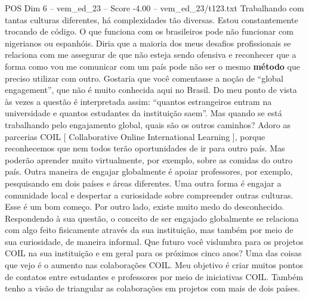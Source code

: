 \begin{textsample}{POS Dim 6 – vem\_ed\_23 – Score -4.00 – vem\_ed\_23/t123.txt}
Trabalhando com tantas culturas diferentes, há complexidades tão diversas.
Estou constantemente trocando de código.
O que funciona com os brasileiros pode não funcionar com nigerianos ou espanhóis.
Diria que a maioria dos meus desafios profissionais se relaciona com me assegurar de que não esteja sendo ofensiva e reconhecer que a forma como vou me comunicar com um país pode não ser o mesmo \textbf{método} que preciso utilizar com outro.
Gostaria que você comentasse a noção de “global engagement”, que não é muito conhecida aqui no Brasil.
Do meu ponto de vista às vezes a questão é interpretada assim: “quantos estrangeiros entram na universidade e quantos estudantes da instituição saem”.
Mas quando se está trabalhando pelo engajamento global, quais são os outros caminhos?
Adoro as parcerias COIL [ Collaborative Online International Learning ], porque reconhecemos que nem todos terão oportunidades de ir para outro país.
Mas poderão aprender muito virtualmente, por exemplo, sobre as comidas do outro país.
Outra maneira de engajar globalmente é apoiar professores, por exemplo, pesquisando em dois países e áreas diferentes.
Uma outra forma é engajar a comunidade local e despertar a curiosidade sobre compreender outras culturas.
Esse é um bom começo.
Por outro lado, existe muito medo do desconhecido.
Respondendo à sua questão, o conceito de ser engajado globalmente se relaciona com algo feito fisicamente através da sua instituição, mas também por meio de sua curiosidade, de maneira informal.
Que futuro você vislumbra para os projetos COIL na sua instituição e em geral para os próximos cinco anos?
Uma das coisas que vejo é o aumento nas colaborações COIL.
Meu objetivo é criar muitos pontos de contatos entre estudantes e professores por meio de iniciativas COIL.
Também tenho a visão de triangular as colaborações em projetos com mais de dois países.

\end{textsample}

